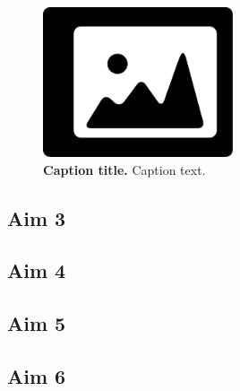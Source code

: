 \lipsum*[5]

\begin{figure}[H]
    \centering
    \includegraphics[width=0.5\textwidth]{figuras/image-single-col}
    \caption{{\bf{Caption title.}} Caption text.}\label{fig:sample}
\end{figure}

\subsection{Aim 3}\label{sec:aim3}

\lipsum*[6]

\subsection{Aim 4}\label{sec:aim4}

\lipsum*[7]

\subsection{Aim 5}\label{sec:aim5}

\lipsum*[8]

\subsection{Aim 6}\label{sec:aim6}

\lipsum*[9]
